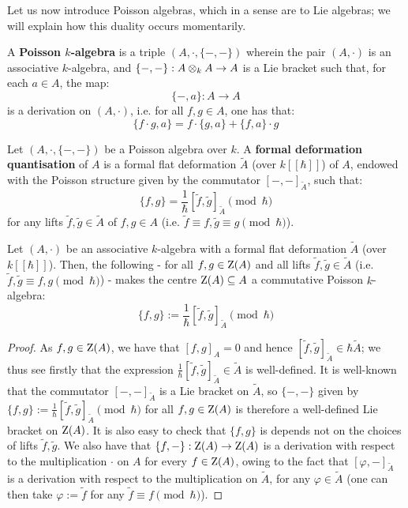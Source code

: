         Let us now introduce Poisson algebras, which in a sense are  to Lie algebras; we will explain how this duality occurs momentarily. 
        \begin{definition} \label{def: poisson_algebras}
            A \textbf{Poisson $k$-algebra} is a triple $(A, \cdot, \{-, -\})$ wherein the pair $(A, \cdot)$ is an associative $k$-algebra, and $\{-, -\}: A \tensor_k A \to A$ is a Lie bracket such that, for each $a \in A$, the map:
                $$\{-, a\}: A \to A$$
            is a derivation on $(A, \cdot)$, i.e. for all $f, g \in A$, one has that:
                $$\{f \cdot g, a\} = f \cdot \{g, a\} + \{f, a\} \cdot g$$
        \end{definition}
        \begin{definition} \label{def: deformation_quantisation}
            Let $(A, \cdot, \{-, -\})$ be a Poisson algebra over $k$. A \textbf{formal deformation quantisation} of $A$ is a formal flat deformation $\tilde{A}$ (over $k[\![\hbar]\!]$) of $A$, endowed with the Poisson structure given by the commutator $[-, -]_{\tilde{A}}$, such that:
                $$\{f, g\} = \frac{1}{\hbar}[\tilde{f}, \tilde{g}]_{\tilde{A}} \pmod{\hbar}$$
            for any lifts $\tilde{f}, \tilde{g} \in \tilde{A}$ of $f, g \in A$ (i.e. $\tilde{f} \equiv f, \tilde{g} \equiv g \pmod{\hbar}$).
        \end{definition}
        \begin{lemma} \label{lemma: poisson_brackets_from_formal_flat_deformations_of_commutative_algebras}
            Let $(A, \cdot)$ be an associative $k$-algebra with a formal flat deformation $\tilde{A}$ (over $k[\![\hbar]\!]$). Then, the following - for all $f, g \in \mathrm{Z}(A)$ and all lifts $\tilde{f}, \tilde{g} \in \tilde{A}$ (i.e. $\tilde{f}, \tilde{g} \equiv f, g \pmod{\hbar}$) - makes the centre $\mathrm{Z}(A) \subseteq A$ a commutative Poisson $k$-algebra:
                $$\{f, g\} := \frac{1}{\hbar}[\tilde{f}, \tilde{g}]_{\tilde{A}} \pmod{\hbar}$$
        \end{lemma}
            \begin{proof}
                As $f, g \in \mathrm{Z}(A)$, we have that $[f, g]_A = 0$ and hence $[\tilde{f}, \tilde{g}]_{\tilde{A}} \in \hbar \tilde{A}$; we thus see firstly that the expression $\frac{1}{\hbar}[\tilde{f}, \tilde{g}]_{\tilde{A}} \in \tilde{A}$ is well-defined. It is well-known that the commutator $[-, -]_{\tilde{A}}$ is a Lie bracket on $\tilde{A}$, so $\{-, -\}$ given by $\{f, g\} := \frac{1}{\hbar}[\tilde{f}, \tilde{g}]_{\tilde{A}} \pmod{\hbar}$ for all $f, g \in \mathrm{Z}(A)$ is therefore a well-defined Lie bracket on $\mathrm{Z}(A)$. It is also easy to check that $\{f, g\}$ is depends not on the choices of lifts $\tilde{f}, \tilde{g}$. We also have that $\{f, -\}: \mathrm{Z}(A) \to \mathrm{Z}(A)$ is a derivation with respect to the multiplication $\cdot$ on $A$ for every $f \in \mathrm{Z}(A)$, owing to the fact that $[\varphi, -]_{\tilde{A}}$ is a derivation with respect to the multiplication on $\tilde{A}$, for any $\varphi \in \tilde{A}$ (one can then take $\varphi := \tilde{f}$ for any $\tilde{f} \equiv f \pmod{\hbar}$).
            \end{proof}
